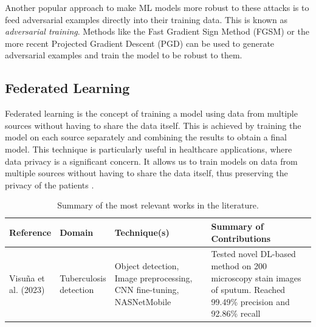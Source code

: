 \documentclass[../main.tex]{subfiles}
\begin{document}
    Another popular approach to make ML models more robust to these attacks is to feed adversarial examples directly into their training data. This is known as \textit{adversarial training}. Methods like the Fast Gradient Sign Method \cite{goodfellowExplainingHarnessingAdversarial2015} (FGSM) or the more recent Projected Gradient Descent (PGD) \autocite{madryDeepLearningModels2019}  can be used to generate adversarial examples and train the model to be robust to them. 


   
    \subsection{Federated Learning} \label{sec:federated_learning} 

    Federated learning is the concept of training a model using data from multiple sources without having to share the data itself. This is achieved by training the model on each source separately and combining the results to obtain a final model. This technique is particularly useful in healthcare applications, where data privacy is a significant concern. It allows us to train models on data from multiple sources without having to share the data itself, thus preserving the privacy of the patients \cite{joshi_federated_2022}.

    \newpage
    \begin{table}[p]
        \caption{Summary of the most relevant works in the literature.}
        \label{tab:sota_summary}
        \hspace*{-1.5cm}
        \begin{tabular}{
            p{0.14\linewidth} | p{0.13\linewidth} | p{0.35\linewidth} | p{0.5\linewidth} 
        }
        \toprule
        \textbf{Reference} & \textbf{Domain} &\textbf{Technique(s)} & \textbf{Summary of Contributions} \\
        \midrule
        Visuña et al. (2023) \cite{visuna_novel_2023} & Tuberculosis detection & Object detection, Image preprocessing, CNN fine-tuning, NASNetMobile & Tested novel DL-based method on 200 microscopy stain images of sputum. Reached  99.49\% precision and 92.86\% recall \\
        \bottomrule
        \end{tabular}
    \end{table}


   
    
\end{document}

